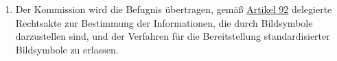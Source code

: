 \begin{enumerate}
  \item Der Kommission wird die Befugnis übertragen, gemäß \hyperref[ch:92]{Artikel 92} delegierte Rechtsakte zur
   Bestimmung der Informationen, die durch Bildsymbole darzustellen sind, und der Verfahren für die Bereitstellung
   standardisierter Bildsymbole zu erlassen.
  \label{itm:12-8}

\end{enumerate}


